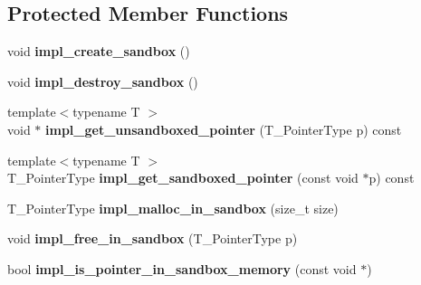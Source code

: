\subsection*{Protected Member Functions}
\begin{DoxyCompactItemize}
\item 
\mbox{\label{classrlbox_1_1rlbox__noop__sandbox_aed3d297784c5654e6d83d4c5d3dacd90}} 
void {\bfseries impl\+\_\+create\+\_\+sandbox} ()
\item 
\mbox{\label{classrlbox_1_1rlbox__noop__sandbox_af1693fb4ff2ac776671d10c2c5481d61}} 
void {\bfseries impl\+\_\+destroy\+\_\+sandbox} ()
\item 
\mbox{\label{classrlbox_1_1rlbox__noop__sandbox_aba431d23d82710301c8c1fe0b7cbf780}} 
{\footnotesize template$<$typename T $>$ }\\void $\ast$ {\bfseries impl\+\_\+get\+\_\+unsandboxed\+\_\+pointer} (T\+\_\+\+Pointer\+Type p) const
\item 
\mbox{\label{classrlbox_1_1rlbox__noop__sandbox_acc83ff58dfef4a5a9c79a0e5b46fbec7}} 
{\footnotesize template$<$typename T $>$ }\\T\+\_\+\+Pointer\+Type {\bfseries impl\+\_\+get\+\_\+sandboxed\+\_\+pointer} (const void $\ast$p) const
\item 
\mbox{\label{classrlbox_1_1rlbox__noop__sandbox_ada393a58fd84c379715f1361df3a1c5d}} 
T\+\_\+\+Pointer\+Type {\bfseries impl\+\_\+malloc\+\_\+in\+\_\+sandbox} (size\+\_\+t size)
\item 
\mbox{\label{classrlbox_1_1rlbox__noop__sandbox_a8722d866e0ebf476050dfa31cc30c2c4}} 
void {\bfseries impl\+\_\+free\+\_\+in\+\_\+sandbox} (T\+\_\+\+Pointer\+Type p)
\item 
\mbox{\label{classrlbox_1_1rlbox__noop__sandbox_ac2eacc65e2a7ab0ca01e1f9ba489422b}} 
bool {\bfseries impl\+\_\+is\+\_\+pointer\+\_\+in\+\_\+sandbox\+\_\+memory} (const void $\ast$)
\item 
\mbox{\label{classrlbox_1_1rlbox__noop__sandbox_a9c1e09e364ee2a9b0e4661664dfd0892}} 

\end{DoxyCompactItemize}
